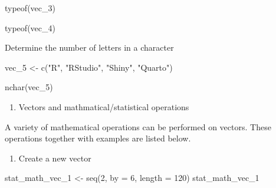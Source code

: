 \documentclass[
  letterpaper,
  DIV=11,
  numbers=noendperiod]{scrreprt}
\newenvironment{Shaded}{}{}
\newcommand{\AttributeTok}[1]{\textcolor[rgb]{0.84,0.23,0.29}{#1}}
\newcommand{\DecValTok}[1]{\textcolor[rgb]{0.00,0.36,0.77}{#1}}
\newcommand{\FunctionTok}[1]{\textcolor[rgb]{0.44,0.26,0.76}{#1}}
\newcommand{\NormalTok}[1]{\textcolor[rgb]{0.14,0.16,0.18}{#1}}
\newcommand{\OtherTok}[1]{\textcolor[rgb]{0.44,0.26,0.76}{#1}}
\newcommand{\StringTok}[1]{\textcolor[rgb]{0.01,0.18,0.38}{#1}}
\providecommand{\tightlist}{%
  \setlength{\itemsep}{0pt}\setlength{\parskip}{0pt}}\usepackage{longtable,booktabs,array}
\begin{document}
\begin{Shaded}
\begin{Highlighting}[]
\FunctionTok{typeof}\NormalTok{(vec\_3)}
\end{Highlighting}
\end{Shaded}

\begin{Shaded}
\begin{Highlighting}[]
\FunctionTok{typeof}\NormalTok{(vec\_4)}
\end{Highlighting}
\end{Shaded}

Determine the number of letters in a character

\begin{Shaded}
\begin{Highlighting}[]
\NormalTok{vec\_5 }\OtherTok{\textless{}{-}} \FunctionTok{c}\NormalTok{(}\StringTok{"R"}\NormalTok{, }\StringTok{"RStudio"}\NormalTok{, }\StringTok{"Shiny"}\NormalTok{, }\StringTok{"Quarto"}\NormalTok{)}
\end{Highlighting}
\end{Shaded}

\begin{Shaded}
\begin{Highlighting}[]
\FunctionTok{nchar}\NormalTok{(vec\_5)}
\end{Highlighting}
\end{Shaded}

\begin{enumerate}
\def\labelenumi{\arabic{enumi}.}
\setcounter{enumi}{2}
\tightlist
\item
  Vectors and mathmatical/statistical operations
\end{enumerate}

A variety of mathematical operations can be performed on vectors. These
operations together with examples are listed below.

\begin{enumerate}
\def\labelenumi{\alph{enumi}.}
\tightlist
\item
  Create a new vector
\end{enumerate}

\begin{Shaded}
\begin{Highlighting}[]
\NormalTok{stat\_math\_vec\_1 }\OtherTok{\textless{}{-}} \FunctionTok{seq}\NormalTok{(}\DecValTok{2}\NormalTok{, }\AttributeTok{by =} \DecValTok{6}\NormalTok{, }\AttributeTok{length =} \DecValTok{120}\NormalTok{)}
\NormalTok{stat\_math\_vec\_1}
\end{Highlighting}
\end{Shaded}
\end{document}
